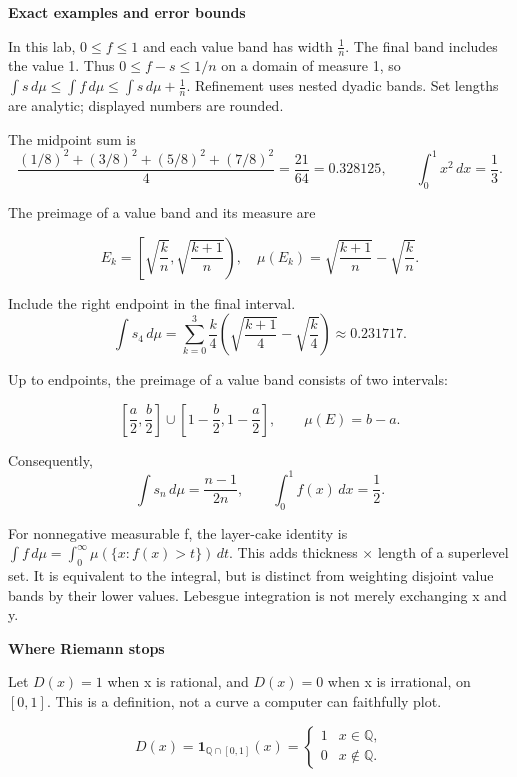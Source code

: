 \documentclass[11pt,a4paper]{article}
\newcommand{\topic}[1]{\vspace{6pt}{\large\bfseries #1}\par}
\newcommand{\pagetitle}[1]{{\LARGE\bfseries #1}\par\vspace{9pt}}
\begin{document}
\newpage

\pagetitle{Exact examples and error bounds}

In this lab, \(0\le f\le1\) and each value band has width \(\frac1n\). The final band includes the value 1. Thus \(0\le f-s\le 1/n\) on a domain of measure 1, so \(\int s\,d\mu\le\int f\,d\mu\le\int s\,d\mu+\frac1n\). Refinement uses nested dyadic bands. Set lengths are analytic; displayed numbers are rounded.

\topic{$f(x)=x^2$, $n=4$}

The midpoint sum is\[\frac{(1/8)^2+(3/8)^2+(5/8)^2+(7/8)^2}{4}=\frac{21}{64}=0.328125,\qquad \int_0^1x^2\,dx=\frac13.\]

The preimage of a value band and its measure are

\[E_k=\left[\sqrt{\frac{k}{n}},\sqrt{\frac{k+1}{n}}\right),\quad \mu(E_k)=\sqrt{\frac{k+1}{n}}-\sqrt{\frac{k}{n}}.\]

Include the right endpoint in the final interval. \[\int s_4\,d\mu=\sum_{k=0}^3\frac{k}{4}\left(\sqrt{\frac{k+1}{4}}-\sqrt{\frac{k}{4}}\right)\approx0.231717.\]

\topic{$f(x)=1-|2x-1|$}

Up to endpoints, the preimage of a value band consists of two intervals:

\[\left[\frac a2,\frac b2\right]\cup\left[1-\frac b2,1-\frac a2\right],\qquad \mu(E)=b-a.\]

Consequently,\[\int s_n\,d\mu=\frac{n-1}{2n},\qquad \int_0^1f(x)\,dx=\frac12.\]

\topic{A related picture: horizontal layers}

For nonnegative measurable f, the layer-cake identity is \(\int f\,d\mu=\int_0^\infty\mu(\{x:f(x)>t\})\,dt\). This adds thickness × length of a superlevel set. It is equivalent to the integral, but is distinct from weighting disjoint value bands by their lower values. Lebesgue integration is not merely exchanging x and y.

\newpage

\pagetitle{Where Riemann stops}

Let \(D(x)=1\) when x is rational, and \(D(x)=0\) when x is irrational, on \([0,1]\). This is a definition, not a curve a computer can faithfully plot.

\[D(x)=\mathbf1_{\mathbb Q\cap[0,1]}(x)=\begin{cases}1&x\in\mathbb Q,\\0&x\notin\mathbb Q.\end{cases}\]
\end{document}
